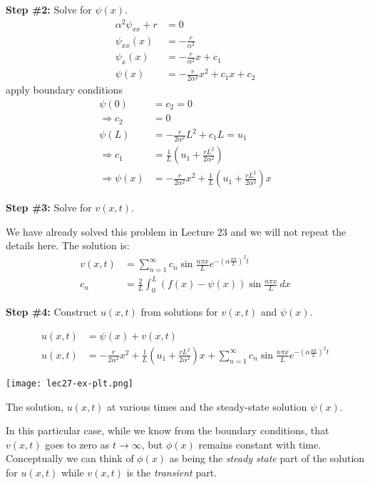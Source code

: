 \noindent\textbf{Step \#2:}  Solve for $\psi(x)$.
\begin{align*}
\alpha^2\psi_{xx}+r &= 0 \\
\psi_{xx}(x) &= -\frac{r}{\alpha^2} \\
\psi_{x}(x) &= -\frac{r}{\alpha^2}x + c_1 \\
\psi(x) &= -\frac{r}{2\alpha^2}x^2+c_1x + c_2
\end{align*}
apply boundary conditions
\begin{align*}
\psi(0) &= c_2 = 0 \\
\Rightarrow c_2 &= 0 \\
\psi(L) &= -\frac{r}{2\alpha^2}L^2 + c_1 L = u_1 \\
\Rightarrow c_1 &= \frac{1}{L}\left(u_1+\frac{rL^2}{2 \alpha^2}\right) \\
\Rightarrow \psi(x) &= -\frac{r}{2\alpha^2}x^2 + \frac{1}{L}\left(u_1+\frac{rL^2}{2 \alpha^2}\right)x
\end{align*}

\vspace{0.25cm}

\noindent\textbf{Step \#3:} Solve for $v(x,t)$.

\vspace{0.25cm}

\noindent We have already solved this problem in Lecture 23 and we will not repeat the details here.  The solution is:
\begin{align*}
v(x,t) &= \sum\limits_{n=1}^{\infty} c_n \sin{\frac{n \pi x}{L}}e^{-\left(\alpha \frac{n \pi}{L}\right)^2 t} \\
c_n &= \frac{2}{L} \int_0^L \left(f(x)-\psi(x)\right)\sin{\frac{n \pi x}{L}} \ dx
\end{align*}

\vspace{0.25cm}

\noindent\textbf{Step \#4:} Construct $u(x,t)$ from solutions for $v(x,t)$ and $\psi(x)$.

\begin{align*}
u(x,t) &= \psi(x) + v(x,t) \\
u(x,t) &= -\frac{r}{2\alpha^2}x^2 + \frac{1}{L}\left(u_1+\frac{rL^2}{2 \alpha^2}\right)x + \sum\limits_{n=1}^{\infty} c_n \sin{\frac{n \pi x}{L}}e^{-\left(\alpha \frac{n \pi}{L}\right)^2 t}
\end{align*}
\begin{marginfigure}
\texttt{[image: lec27-ex-plt.png]}
\caption{The solution, $u(x,t)$ at various times and the steady-state solution $\psi(x)$.}
\label{fig:lec27-ex-plt}
\end{marginfigure}
In this particular case, while we know from the boundary conditions, that $v(x,t)$ goes to zero as $t \rightarrow \infty$, but $\phi(x)$ remains constant with time.  Conceptually we can think of $\phi(x)$ as being the \emph{steady state} part of the solution for $u(x,t)$ while $v(x,t)$ is the \emph{transient} part.

